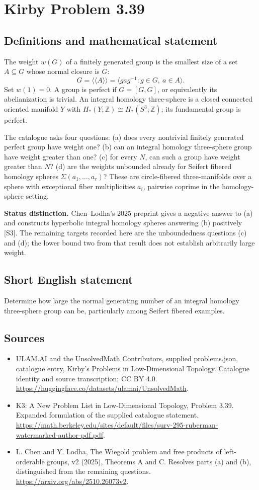 \documentclass[11pt,a4paper]{article}
\begin{document}
\section*{Kirby Problem 3.39}\label{statement}

\subsection{Definitions and mathematical statement}
The weight $w(G)$ of a finitely generated group is the smallest size of a
set $A\subseteq G$ whose normal closure is $G$:
\[
 G=\langle\!\langle A\rangle\!\rangle
   =\langle gag^{-1}:g\in G,\ a\in A\rangle.
\]
Set $w(1)=0$. A group is perfect if $G=[G,G]$, or equivalently its
abelianization is trivial. An integral homology three-sphere is a closed
connected oriented manifold $Y$ with $H_*(Y;\mathbb Z)\cong H_*(S^3;\mathbb Z)$;
its fundamental group is perfect.

The catalogue asks four questions: (a) does every nontrivial finitely generated
perfect group have weight one? (b) can an integral homology three-sphere
group have weight greater than one? (c) for every $N$, can such a group have
weight greater than $N$? (d) are the weights unbounded already for Seifert
fibered homology spheres $\Sigma(a_1,\ldots,a_r)$? These are circle-fibered
three-manifolds over a sphere with exceptional fiber multiplicities $a_i$,
pairwise coprime in the homology-sphere setting.

\textbf{Status distinction.} Chen--Lodha's 2025 preprint gives a negative
answer to (a) and constructs hyperbolic integral homology spheres answering
(b) positively [S3]. The remaining targets recorded here are the unboundedness
questions (c) and (d); the lower bound two from that result does not establish
arbitrarily large weight.
\subsection{Short English statement}
Determine how large the normal generating number of an integral homology three-sphere group can be, particularly among Seifert fibered examples.
\subsection{Sources}
\begin{itemize}
\item[S1] ULAM.AI and the UnsolvedMath Contributors, supplied problems.json, catalogue entry, Kirby's Problems in Low-Dimensional Topology. Catalogue identity and source transcription; CC BY 4.0.
\url{https://huggingface.co/datasets/ulamai/UnsolvedMath}.
\item[S2] K3: A New Problem List in Low-Dimensional Topology, Problem 3.39. Expanded formulation of the supplied catalogue statement.
\url{https://math.berkeley.edu/sites/default/files/surv-295-ruberman-watermarked-author-pdf.pdf}.
\item[S3] L. Chen and Y. Lodha, The Wiegold problem and free products of left-orderable groups, v2 (2025), Theorems A and C. Resolves parts (a) and (b), distinguished from the remaining questions.
\url{https://arxiv.org/abs/2510.26073v2}.
\end{itemize}
\end{document}

